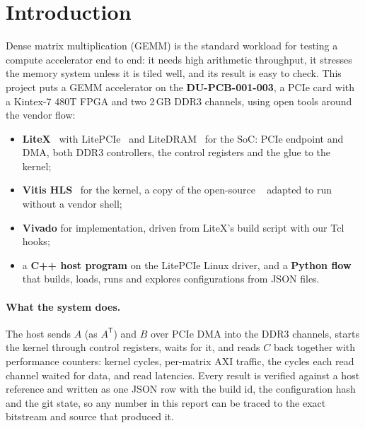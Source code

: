 \section{Introduction}
\label{sec:intro}

Dense matrix multiplication (GEMM) is the standard workload for testing a compute accelerator end to end: it needs
high arithmetic throughput, it stresses the memory system unless it is tiled well, and its result is easy to check.
This project puts a GEMM accelerator on the \textbf{DU-PCB-001-003}, a PCIe card with a Kintex-7 480T FPGA and two
2\,GB DDR3 channels, using open tools around the vendor flow:
\begin{itemize}
  \item \textbf{LiteX}~\cite{litex} with LitePCIe~\cite{litepcie} and LiteDRAM~\cite{litedram} for the SoC: PCIe
        endpoint and DMA, both DDR3 controllers, the control registers and the glue to the kernel;
  \item \textbf{Vitis HLS}~\cite{ug1399} for the kernel, a copy of the open-source ~\cite{gemmhls,gemmhlsrepo}
        adapted to run without a vendor shell;
  \item \textbf{Vivado} for implementation, driven from LiteX's build script with our Tcl hooks;
  \item a \textbf{C++ host program} on the LitePCIe Linux driver, and a \textbf{Python flow} that builds, loads,
        runs and explores configurations from JSON files.
\end{itemize}

\paragraph{What the system does.} The host sends \(A\) (as \(A^\mathsf{T}\)) and \(B\) over PCIe DMA into the DDR3
channels, starts the kernel through control registers, waits for it, and reads \(C\) back together with performance
counters: kernel cycles, per-matrix AXI traffic, the cycles each read channel waited for data, and read latencies.
Every result is verified against a host reference and written as one JSON row with the build id, the configuration
hash and the git state, so any number in this report can be traced to the exact bitstream and source that produced it.

